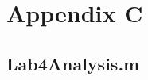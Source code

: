 \chapter{Appendix C}
\section{Lab4Analysis.m}

\inputminted{matlab}{Code/Lab4Analysis.m}\label{listing:data_analysis_script}